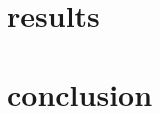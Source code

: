 \documentclass[10pt]{article}
\begin{document}
\section{results}

\blindtext

\section{conclusion}

\blindtext



%
\end{document}
